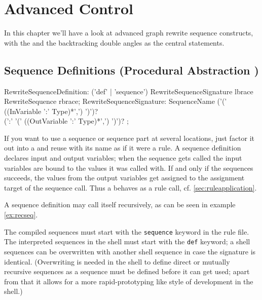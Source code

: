 \chapter{Advanced Control}\label{cha:transaction}

In this chapter we'll have a look at advanced graph rewrite sequence constructs,
with the  and the backtracking double angles as the central statements.


\section{Sequence Definitions (Procedural Abstraction )} \label{sec:sequencedefinition}
\begin{rail}
  RewriteSequenceDefinition: 
    ('def' | 'sequence') RewriteSequenceSignature lbrace RewriteSequence rbrace;
  RewriteSequenceSignature: 
    SequenceName ('(' ((InVariable ':' Type)*',') ')')? \\ (':' '(' ((OutVariable ':' Type)*',') ')')?
	;
\end{rail}

If you want to use a sequence or sequence part at several locations, just factor it out into a  and reuse with its name as if it were a rule.
A sequence definition declares input and output variables; 
when the sequence gets called the input variables are bound to the values it was called with.
If and only if the sequences succeeds, the values from the output variables get assigned to the assignment target of the sequence call.
Thus a  behaves as a rule call, cf. \ref{sec:ruleapplication}.

A sequence definition may call itself recursively, as can be seen in example \ref{ex:recseq}.

The compiled sequences must start with the \texttt{sequence} keyword in the rule file.
The interpreted sequences in the shell must start with the \texttt{def} keyword; a shell sequences can be overwritten with another shell sequence in case the signature is identical. (Overwriting is needed in the shell to define direct or mutually recursive sequences as a sequence must be defined before it can get used; apart from that it allows for a more rapid-prototyping like style of development in the shell.)

